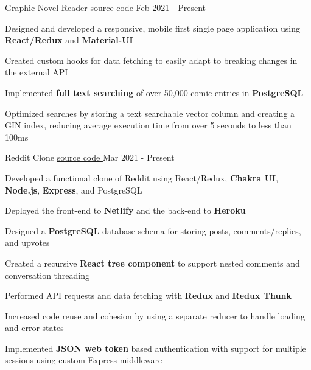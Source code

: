 
\begin{cventries}
  \cventry
    {\fontsize{10pt}{1em}\bodyfont\upshape\color{text}{Front-end comic reading client for the MangaDex API}} %
    {Graphic Novel Reader} %
    {\href{https://github.com/tacticaltofu/mangastack}{source code \faExternalLink}} %
    {Feb 2021 - Present} %
    {
      \begin{cvitems} %
        \item {Designed and developed a responsive, mobile first single page application using \textbf{React/Redux} and \textbf{Material-UI}}
        \item {Created custom hooks for data fetching to easily adapt to breaking changes in the external API}
        \item {Implemented \textbf{full text searching} of over 50,000 comic entries in \textbf{PostgreSQL}}
        \item {Optimized searches by storing a text searchable vector column and creating a GIN index, reducing average execution time from over 5 seconds to less than 100ms}
      \end{cvitems}
    }
    
  \cventry
    {\fontsize{10pt}{1em}\bodyfont\upshape\color{text}{News aggregation and discussion website very similar to Reddit}} %
    {Reddit Clone} %
    {\href{https://github.com/tacticaltofu/reddit-clone}{source code \faExternalLink}} %
    {Mar 2021 - Present} %
    {
      \begin{cvitems} %
        \item {Developed a functional clone of Reddit using React/Redux, \textbf{Chakra UI}, \textbf{Node.js}, \textbf{Express}, and PostgreSQL}
        \item {Deployed the front-end to \textbf{Netlify} and the back-end to \textbf{Heroku} }
        \item {Designed a \textbf{PostgreSQL} database schema for storing posts, comments/replies, and upvotes}
        \item {Created a recursive \textbf{React tree component} to support nested comments and conversation threading}
        \item {Performed API requests and data fetching with \textbf{Redux} and \textbf{Redux Thunk}}
        \item {Increased code reuse and cohesion by using a separate reducer to handle loading and error states}
        \item {Implemented \textbf{JSON web token} based authentication with support for multiple sessions using custom Express middleware}
      \end{cvitems}
    }
\end{cventries}